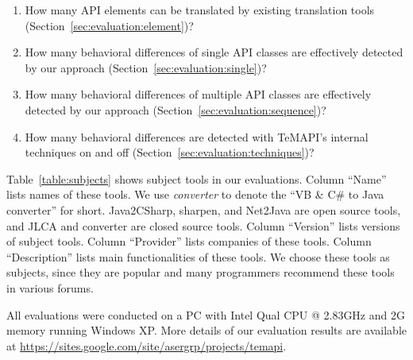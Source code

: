 \vspace*{-1.5ex}
\begin{enumerate}
\item How many API elements can be translated by existing translation tools (Section~\ref{sec:evaluation:element})? \vspace*{-1.8ex}
\item How many behavioral differences of single API classes are effectively detected by our approach (Section~\ref{sec:evaluation:single})?\vspace*{-1.8ex}
\item How many behavioral differences of multiple API classes are effectively detected by our approach (Section~\ref{sec:evaluation:sequence})?\vspace*{-1.8ex}
\item How many behavioral differences are detected with TeMAPI's internal techniques on and off (Section~\ref{sec:evaluation:techniques})?
\end{enumerate}\vspace*{-1.5ex}

Table~\ref{table:subjects} shows subject tools in our evaluations. Column ``Name'' lists names of these tools. We use \emph{converter} to denote the ``VB \& C\# to Java converter'' for short. Java2CSharp, sharpen, and Net2Java are open source tools, and JLCA and converter are closed source tools. Column ``Version'' lists versions of subject tools. Column ``Provider'' lists companies of these tools. Column ``Description'' lists main functionalities of these tools. We choose these tools as subjects, since they are popular and many programmers recommend these tools in various forums.

All evaluations were conducted on a PC with Intel Qual CPU @ 2.83GHz and 2G memory running Windows XP. More details
of our evaluation results are available at \url{https://sites.google.com/site/asergrp/projects/temapi}.


